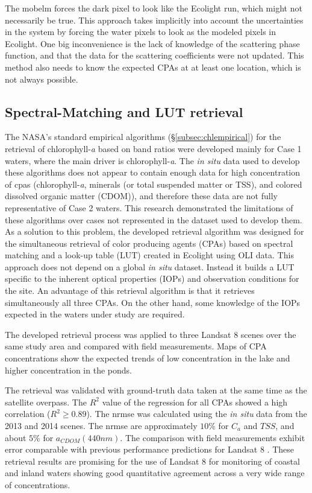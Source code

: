 The \gls{mobelm} forces the dark pixel to look like the Ecolight run, which might not necessarily be true. This approach takes implicitly into account the uncertainties in the system by forcing the water pixels to look as the modeled pixels in Ecolight. One big inconvenience is the lack of knowledge of the scattering phase function, and that the data for the scattering coefficients were not updated. This method also needs to know the expected CPAs at at least one location, which is not always possible.

\subsection{Spectral-Matching and LUT retrieval}
The NASA's standard empirical algorithms (\S\ref{subsec:chlempirical}) for the retrieval of chlorophyll-{\it a} based on band ratios were developed mainly for Case 1 waters, where the main driver is chlorophyll-{\it a}. The {\it in situ} data used to develop these algorithms does not appear to contain enough data for high concentration of \gls{cpas} (chlorophyll-{\it a}, minerals (or total suspended matter or TSS), and colored dissolved organic matter (CDOM)), and therefore these data are not fully representative of Case 2 waters. This research demonstrated the limitations of these algorithms over cases not represented in the dataset used to develop them. As a solution to this problem, the developed retrieval algorithm was designed for the simultaneous retrieval of color producing agents (CPAs) based on spectral matching and a look-up table (LUT) created in Ecolight using OLI data. This approach does not depend on a global {\it in situ} dataset. Instead it builds a LUT specific to the inherent optical properties (IOPs) and observation conditions for the site. An advantage of this retrieval algorithm is that it retrieves simultaneously all three CPAs. On the other hand, some knowledge of the IOPs expected in the waters under study are required.

The developed retrieval process was applied to three  Landsat 8 scenes over the same study area and compared with field measurements. Maps of CPA concentrations show the expected trends of low concentration in the lake and higher concentration in the ponds.  

The retrieval was validated with ground-truth data taken at the same time as the satellite overpass. The $R^2$ value of the regression for all CPAs showed a high correlation ($R^2\geq0.89$). The \gls{nrmse} was calculated using the {\it in situ} data from the 2013 and 2014 scenes. The \gls{nrmse} are approximately $10\%$ for $C_a$ and $TSS$, and about $5\%$ for $a_{CDOM}(440nm)$. The comparison with field measurements exhibit error comparable with previous performance predictions for Landsat 8 \cite{Gerace:2013}. These retrieval results are promising for the use of Landsat 8 for monitoring of coastal and inland waters showing good quantitative agreement across a very wide range of concentrations.

